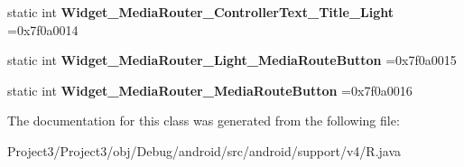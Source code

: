 \begin{DoxyCompactItemize}
static int {\bfseries Widget\+\_\+\+Media\+Router\+\_\+\+Controller\+Text\+\_\+\+Title\+\_\+\+Light} =0x7f0a0014
\item 
\mbox{\label{classandroid_1_1support_1_1v4_1_1R_1_1style_a804e9cc186d5c3ec78feddc66fe01977}} 
static int {\bfseries Widget\+\_\+\+Media\+Router\+\_\+\+Light\+\_\+\+Media\+Route\+Button} =0x7f0a0015
\item 
\mbox{\label{classandroid_1_1support_1_1v4_1_1R_1_1style_aa2b07eb8c57f8b5b8e184214da538ec5}} 
static int {\bfseries Widget\+\_\+\+Media\+Router\+\_\+\+Media\+Route\+Button} =0x7f0a0016
\end{DoxyCompactItemize}


The documentation for this class was generated from the following file\+:\begin{DoxyCompactItemize}
\item 
Project3/\+Project3/obj/\+Debug/android/src/android/support/v4/R.\+java\end{DoxyCompactItemize}
